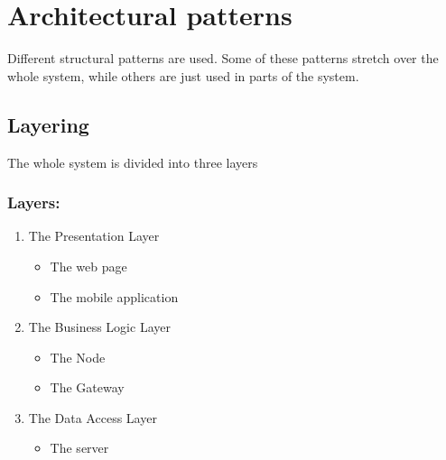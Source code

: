 \section{Architectural patterns}
Different structural patterns are used. Some of these patterns stretch over the whole system, while others are just used in parts of the system.
\subsection{Layering}The whole system is divided into three layers
\subsubsection{Layers:}
\begin{enumerate}
\item The Presentation Layer
    \begin{itemize}
    \item The web page
    \item The mobile application
    \end{itemize}
\item The Business Logic Layer
 \begin{itemize}


    \item The Node
    \item The Gateway
        \end{itemize}
\item The Data Access Layer
    \begin{itemize}
    \item The server
    \end{itemize}

\end{enumerate}
